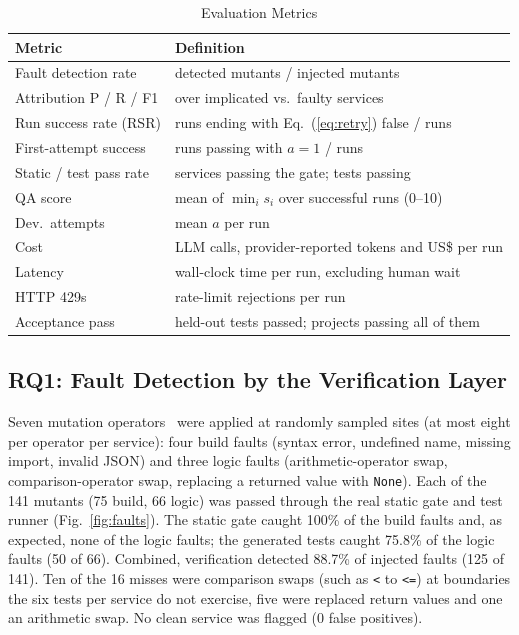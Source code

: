 \documentclass[conference,letterpaper]{IEEEtran}
\begin{document}
\begin{table}[t]
\caption{Evaluation Metrics}
\label{tab:metrics}
\centering
\footnotesize
\begin{tabular}{@{}>{\raggedright}p{3.1cm}>{\raggedright\arraybackslash}p{5.2cm}@{}}
\toprule
Metric & Definition \\
\midrule
Fault detection rate & detected mutants / injected mutants \\
Attribution P / R / F1 & over implicated vs.\ faulty services \\
Run success rate (RSR) & runs ending with Eq.~(\ref{eq:retry}) false / runs \\
First-attempt success & runs passing with $a=1$ / runs \\
Static / test pass rate & services passing the gate; tests passing \\
QA score & mean of $\min_i s_i$ over successful runs (0--10) \\
Dev.\ attempts & mean $a$ per run \\
Cost & LLM calls, provider-reported tokens and US\$ per run \\
Latency & wall-clock time per run, excluding human wait \\
HTTP 429s & rate-limit rejections per run \\
Acceptance pass & held-out tests passed; projects passing all of them \\
\bottomrule
\end{tabular}
\end{table}

\subsection{RQ1: Fault Detection by the Verification Layer}
Seven mutation operators~\cite{jia2011mutation} were applied at randomly sampled
sites (at most eight per operator per service): four build faults (syntax error,
undefined name, missing import, invalid JSON) and three logic faults
(arithmetic-operator swap, comparison-operator swap, replacing a returned value
with \texttt{None}). Each of the 141 mutants (75 build, 66 logic) was passed
through the real static gate and test runner (Fig.~\ref{fig:faults}). The static
gate caught 100\% of the build faults and, as expected, none of the logic
faults; the generated tests caught 75.8\% of the logic faults (50 of 66).
Combined, verification detected 88.7\% of injected faults (125 of 141). Ten of
the 16 misses were comparison swaps (such as \texttt{<} to \texttt{<=}) at
boundaries the six tests per service do not exercise, five were replaced return
values and one an arithmetic swap. No clean service was flagged (0 false
positives).
\end{document}
